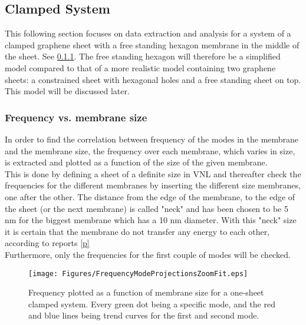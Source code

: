 \subsection{Clamped System}
This following section focuses on data extraction and analysis for a system of a clamped graphene sheet with a free standing hexagon membrane in the middle of the sheet. See \cref{}. The free standing hexagon will therefore be a simplified model compared to that of a more realistic model containing two graphene sheets: a constrained sheet with hexagonal holes and a free standing sheet on top. This model will be discussed later. 
\subsubsection{Frequency vs. membrane size}
In order to find the correlation between frequency of the modes in the membrane and the membrane size, the frequency over each membrane, which varies in size, is extracted and plotted as a function of the size of the given membrane. \\
This is done by defining a sheet of a definite size in VNL and thereafter check the frequencies for the different membranes by inserting the different size membranes, one after the other. The distance from the edge of the membrane, to the edge of the sheet (or the next membrane) is called "neck" and has been chosen to be 5 nm for the biggest membrane which has a 10 nm diameter. With this "neck" size it is certain that the membrane do not transfer any energy to each other, according to reports \ref{p} \\
Furthermore, only the frequencies for the first couple of modes will be checked.
\onecolumngrid

\begin{figure}[H]
    \centering
    \texttt{[image: Figures/FrequencyModeProjectionsZoomFit.eps]}
    \caption{Frequency plotted as a function of membrane size for a one-sheet clamped system. Every green dot being a specific mode, and the red and blue lines being trend curves for the first and second mode.}
    \label{size vs frequency}
\end{figure}
\twocolumngrid

